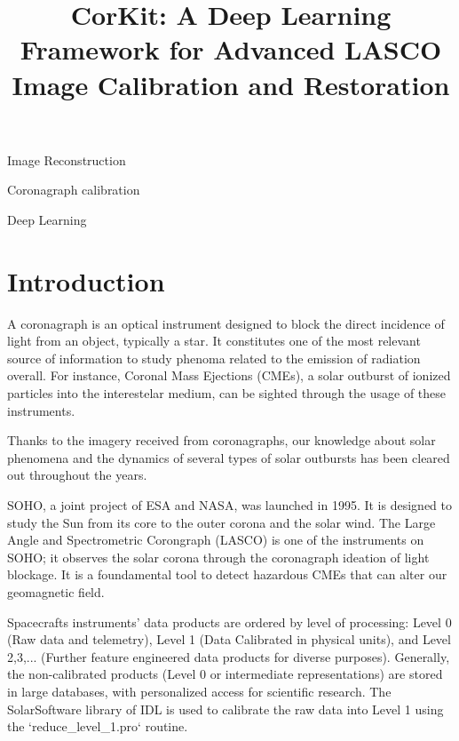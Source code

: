 \documentclass[draft]{agujournal2019}
\begin{document}
\title{CorKit: A Deep Learning Framework for Advanced LASCO Image Calibration and Restoration}


\begin{keypoints}
\item Image Reconstruction
\item Coronagraph calibration
\item Deep Learning
\end{keypoints}

\begin{abstract}
\end{abstract}

\section{Introduction}

A coronagraph is an optical instrument designed to block the direct incidence of light from an object, typically a star. It constitutes one of the most relevant source of information to study phenoma related to the emission of radiation overall. For instance, Coronal Mass Ejections (CMEs), a solar outburst of ionized particles into the interestelar medium, can be sighted through the usage of these instruments.

Thanks to the imagery received from coronagraphs, our knowledge about solar phenomena and the dynamics of several types of solar outbursts has been cleared out throughout the years.

SOHO, a joint project of ESA and NASA, was launched in 1995. It is designed to study the Sun from its core to the outer corona and the solar wind. The Large Angle and Spectrometric Corongraph (LASCO) is one of the instruments on SOHO; it observes the solar corona through the coronagraph ideation of light blockage. It is a foundamental tool to detect hazardous CMEs that can alter our geomagnetic field.

Spacecrafts instruments' data products are ordered by level of processing: Level 0 (Raw data and telemetry), Level 1 (Data Calibrated in physical units), and Level 2,3,... (Further feature engineered data products for diverse purposes). Generally, the non-calibrated products (Level 0 or intermediate representations) are stored in large databases, with personalized access for scientific research. The SolarSoftware library of IDL is used to calibrate the raw data into Level 1 using the `reduce_level_1.pro` routine.
\end{document}
